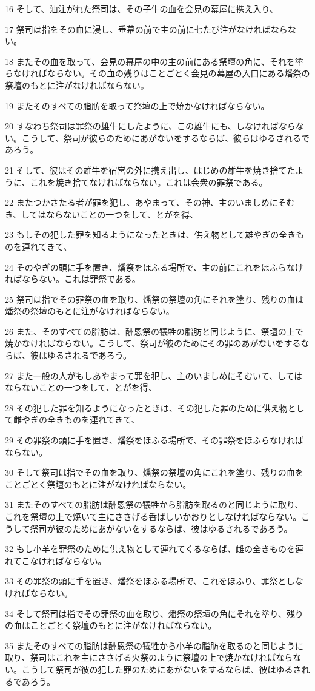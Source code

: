\par 16 そして、油注がれた祭司は、その子牛の血を会見の幕屋に携え入り、
\par 17 祭司は指をその血に浸し、垂幕の前で主の前に七たび注がなければならない。
\par 18 またその血を取って、会見の幕屋の中の主の前にある祭壇の角に、それを塗らなければならない。その血の残りはことごとく会見の幕屋の入口にある燔祭の祭壇のもとに注がなければならない。
\par 19 またそのすべての脂肪を取って祭壇の上で焼かなければならない。
\par 20 すなわち祭司は罪祭の雄牛にしたように、この雄牛にも、しなければならない。こうして、祭司が彼らのためにあがないをするならば、彼らはゆるされるであろう。
\par 21 そして、彼はその雄牛を宿営の外に携え出し、はじめの雄牛を焼き捨てたように、これを焼き捨てなければならない。これは会衆の罪祭である。
\par 22 またつかさたる者が罪を犯し、あやまって、その神、主のいましめにそむき、してはならないことの一つをして、とがを得、
\par 23 もしその犯した罪を知るようになったときは、供え物として雄やぎの全きものを連れてきて、
\par 24 そのやぎの頭に手を置き、燔祭をほふる場所で、主の前にこれをほふらなければならない。これは罪祭である。
\par 25 祭司は指でその罪祭の血を取り、燔祭の祭壇の角にそれを塗り、残りの血は燔祭の祭壇のもとに注がなければならない。
\par 26 また、そのすべての脂肪は、酬恩祭の犠牲の脂肪と同じように、祭壇の上で焼かなければならない。こうして、祭司が彼のためにその罪のあがないをするならば、彼はゆるされるであろう。
\par 27 また一般の人がもしあやまって罪を犯し、主のいましめにそむいて、してはならないことの一つをして、とがを得、
\par 28 その犯した罪を知るようになったときは、その犯した罪のために供え物として雌やぎの全きものを連れてきて、
\par 29 その罪祭の頭に手を置き、燔祭をほふる場所で、その罪祭をほふらなければならない。
\par 30 そして祭司は指でその血を取り、燔祭の祭壇の角にこれを塗り、残りの血をことごとく祭壇のもとに注がなければならない。
\par 31 またそのすべての脂肪は酬恩祭の犠牲から脂肪を取るのと同じように取り、これを祭壇の上で焼いて主にささげる香ばしいかおりとしなければならない。こうして祭司が彼のためにあがないをするならば、彼はゆるされるであろう。
\par 32 もし小羊を罪祭のために供え物として連れてくるならば、雌の全きものを連れてこなければならない。
\par 33 その罪祭の頭に手を置き、燔祭をほふる場所で、これをほふり、罪祭としなければならない。
\par 34 そして祭司は指でその罪祭の血を取り、燔祭の祭壇の角にそれを塗り、残りの血はことごとく祭壇のもとに注がなければならない。
\par 35 またそのすべての脂肪は酬恩祭の犠牲から小羊の脂肪を取るのと同じように取り、祭司はこれを主にささげる火祭のように祭壇の上で焼かなければならない。こうして祭司が彼の犯した罪のためにあがないをするならば、彼はゆるされるであろう。


